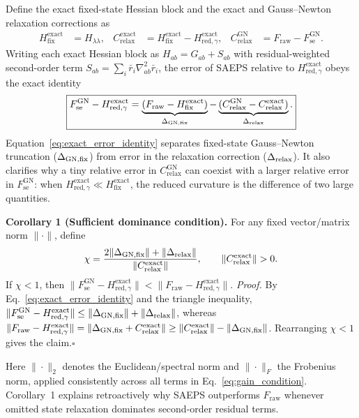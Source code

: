 \documentclass[preprint,11pt]{elsarticle}
\newcommand{\Fraw}{F_{\mathrm{raw}}}
\newcommand{\Fse}{F_{\mathrm{se}}^{\mathrm{GN}}}
\newcommand{\Hred}{H_{\mathrm{red},\gamma}^{\mathrm{exact}}}
\newcommand{\Hfix}{H_{\mathrm{fix}}^{\mathrm{exact}}}
\newcommand{\Cexact}{C_{\mathrm{relax}}^{\mathrm{exact}}}
\newcommand{\Cgn}{C_{\mathrm{relax}}^{\mathrm{GN}}}
\begin{document}
Define the exact fixed-state Hessian block and the exact and Gauss--Newton relaxation corrections as
\begin{align}
 \Hfix&=H_{\lambda\lambda},&
 \Cexact&=\Hfix-\Hred,&
 \Cgn&=\Fraw-\Fse.
 \label{eq:relaxation_defs}
\end{align}
Writing each exact Hessian block as $H_{ab}=G_{ab}+S_{ab}$ with residual-weighted second-order term $S_{ab}=\sum_i\bar r_i\nabla^2_{ab}\bar r_i$, the error of SAEPS relative to $\Hred$ obeys the exact identity
\begin{equation}
 \boxed{\Fse-\Hred
 =\underbrace{(\Fraw-\Hfix)}_{\Delta_{\rm GN,fix}}
 -\underbrace{(\Cgn-\Cexact)}_{\Delta_{\rm relax}}.}
 \label{eq:exact_error_identity}
\end{equation}
Equation~\eqref{eq:exact_error_identity} separates fixed-state Gauss--Newton truncation ($\Delta_{\rm GN,fix}$) from error in the relaxation correction ($\Delta_{\rm relax}$).
It also clarifies why a tiny relative error in $\Cgn$ can coexist with a larger relative error in $\Fse$: when $\Hred\ll\Hfix$, the reduced curvature is the difference of two large quantities.

\medskip\noindent\textbf{Corollary 1 (Sufficient dominance condition).}\label{cor:gain_condition}
For any fixed vector/matrix norm $\|\cdot\|$, define
\begin{equation}
 \chi=\frac{2\|\Delta_{\rm GN,fix}\|+\|\Delta_{\rm relax}\|}{\|\Cexact\|},
 \qquad \|\Cexact\|>0.
 \label{eq:gain_condition}
\end{equation}
If $\chi<1$, then $\|\Fse-\Hred\|<\|\Fraw-\Hred\|$.
\emph{Proof.}
By Eq.~\eqref{eq:exact_error_identity} and the triangle inequality, $\|\Fse-\Hred\|\le\|\Delta_{\rm GN,fix}\|+\|\Delta_{\rm relax}\|$, whereas $\|\Fraw-\Hred\|=\|\Delta_{\rm GN,fix}+\Cexact\|\ge\|\Cexact\|-\|\Delta_{\rm GN,fix}\|$.
Rearranging $\chi<1$ gives the claim.\hfill$\square$

Here $\|\cdot\|_2$ denotes the Euclidean/spectral norm and $\|\cdot\|_F$ the Frobenius norm, applied consistently across all terms in Eq.~\eqref{eq:gain_condition}.
Corollary~1 explains retroactively why SAEPS outperforms $\Fraw$ whenever omitted state relaxation dominates second-order residual terms.
\end{document}

